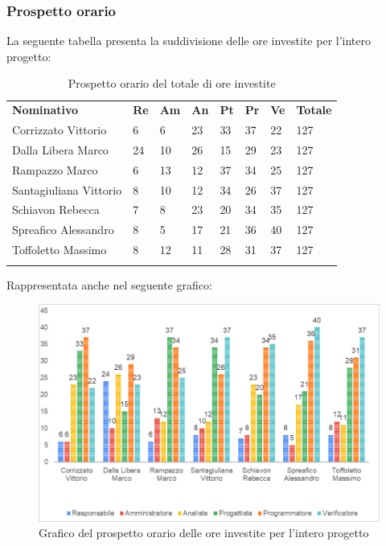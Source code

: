 \subsubsection{Prospetto orario}
La seguente tabella presenta la suddivisione delle ore investite per l'intero progetto\glo:
\begin{longtable} {				
		>{}p{40mm}  
		>{}p{8mm}
		>{}p{8mm}
		>{}p{8mm}
		>{}p{8mm}
		>{}p{8mm}
		>{}p{8mm}
		>{}p{12mm}			
	}			
	\rowcolor{gray!50}
	\textbf{Nominativo} & \textbf{Re} & \textbf{Am} & \textbf{An} & \textbf{Pt} & \textbf{Pr} & \textbf{Ve} & \textbf{Totale}	\TBstrut \\ [2mm]
	Corrizzato Vittorio & 6 & 6 & 23 & 33 & 37 & 22 & 127 \TBstrut \\ [2mm]
	Dalla Libera Marco & 24 & 10 & 26 & 15 & 29 & 23 & 127 \TBstrut \\ [2mm]
	Rampazzo Marco & 6 & 13 & 12 & 37 & 34 & 25 & 127 \TBstrut \\ [2mm]
	Santagiuliana Vittorio & 8 & 10 & 12 & 34 & 26 & 37 & 127 \TBstrut \\ [2mm]
	Schiavon Rebecca & 7 & 8 & 23 & 20 & 34 & 35 & 127 \TBstrut \\ [2mm]
	Spreafico Alessandro & 8 & 5 & 17 & 21 & 36 & 40 & 127 \TBstrut \\ [2mm]
	Toffoletto Massimo & 8 & 12 & 11 & 28 & 31 & 37 & 127 \TBstrut \\ [2mm]
	\rowcolor{white}
	\caption{Prospetto orario del totale di ore investite}
\end{longtable}
\pagebreak
Rappresentata anche nel seguente grafico:
\begin{figure} [H]
	\includegraphics[width=\linewidth]{./img/Grafici/9.png}
	\caption{Grafico del prospetto orario delle ore investite per l'intero progetto\glo}
\end{figure}

